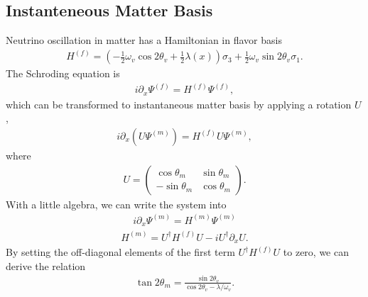\documentclass[letterpaper,12pt,english]{sphinxmanual}
\begin{document}
\subsection{Instanteneous Matter Basis}
\label{\detokenize{matter-stimulated/msw-revisted:instanteneous-matter-basis}}
Neutrino oscillation in matter has a Hamiltonian in flavor basis
\begin{equation*}
\begin{split}H^{(f)} = \left(- \frac{1}{2} \omega_v \cos 2\theta_v +\frac{1}{2}\lambda(x)  \right)\sigma_3 + \frac{1}{2} \omega_v \sin 2\theta_v \sigma_1.\end{split}
\end{equation*}
The Schroding equation is
\begin{equation*}
\begin{split}i \partial_x \Psi^{(f)} = H^{(f)} \Psi^{(f)},\end{split}
\end{equation*}
which can be transformed to instantaneous matter basis by applying a rotation \(U\),
\begin{equation*}
\begin{split}i \partial_x \left(  U\Psi^{(m)} \right)= H^{(f)} U\Psi^{(m)},\end{split}
\end{equation*}
where
\begin{equation*}
\begin{split}U = \begin{pmatrix} \cos \theta_m & \sin \theta_m \\ -\sin\theta_m & \cos \theta_m \end{pmatrix}.\end{split}
\end{equation*}
With a little algebra, we can write the system into
\begin{equation*}
\begin{split}i \partial _x \Psi^{(m)} = H^{(m)}\Psi^{(m)}\end{split}
\end{equation*}\begin{equation*}
\begin{split}H^{(m)} = U^\dagger H^{(f)} U - i U^\dagger \partial_x U.\end{split}
\end{equation*}
By setting the off-diagonal elements of the first term \(U^\dagger H^{(f)} U\) to zero, we can derive the relation
\begin{equation*}
\begin{split}\tan 2\theta_m = \frac{\sin 2\theta_v}{\cos 2\theta_v - \lambda/\omega_v}.\end{split}
\end{equation*}
\end{document}
